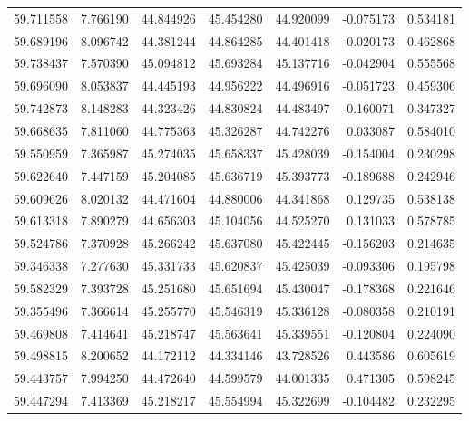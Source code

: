 \begin{tabular}{rrrrrrr}
 59.711558 &   7.766190 &         44.844926 &         45.454280 &         44.920099 & -0.075173 &  0.534181 \\
 59.689196 &   8.096742 &         44.381244 &         44.864285 &         44.401418 & -0.020173 &  0.462868 \\
 59.738437 &   7.570390 &         45.094812 &         45.693284 &         45.137716 & -0.042904 &  0.555568 \\
 59.696090 &   8.053837 &         44.445193 &         44.956222 &         44.496916 & -0.051723 &  0.459306 \\
 59.742873 &   8.148283 &         44.323426 &         44.830824 &         44.483497 & -0.160071 &  0.347327 \\
 59.668635 &   7.811060 &         44.775363 &         45.326287 &         44.742276 &  0.033087 &  0.584010 \\
 59.550959 &   7.365987 &         45.274035 &         45.658337 &         45.428039 & -0.154004 &  0.230298 \\
 59.622640 &   7.447159 &         45.204085 &         45.636719 &         45.393773 & -0.189688 &  0.242946 \\
 59.609626 &   8.020132 &         44.471604 &         44.880006 &         44.341868 &  0.129735 &  0.538138 \\
 59.613318 &   7.890279 &         44.656303 &         45.104056 &         44.525270 &  0.131033 &  0.578785 \\
 59.524786 &   7.370928 &         45.266242 &         45.637080 &         45.422445 & -0.156203 &  0.214635 \\
 59.346338 &   7.277630 &         45.331733 &         45.620837 &         45.425039 & -0.093306 &  0.195798 \\
 59.582329 &   7.393728 &         45.251680 &         45.651694 &         45.430047 & -0.178368 &  0.221646 \\
 59.355496 &   7.366614 &         45.255770 &         45.546319 &         45.336128 & -0.080358 &  0.210191 \\
 59.469808 &   7.414641 &         45.218747 &         45.563641 &         45.339551 & -0.120804 &  0.224090 \\
 59.498815 &   8.200652 &         44.172112 &         44.334146 &         43.728526 &  0.443586 &  0.605619 \\
 59.443757 &   7.994250 &         44.472640 &         44.599579 &         44.001335 &  0.471305 &  0.598245 \\
 59.447294 &   7.413369 &         45.218217 &         45.554994 &         45.322699 & -0.104482 &  0.232295 \\

\end{tabular}
